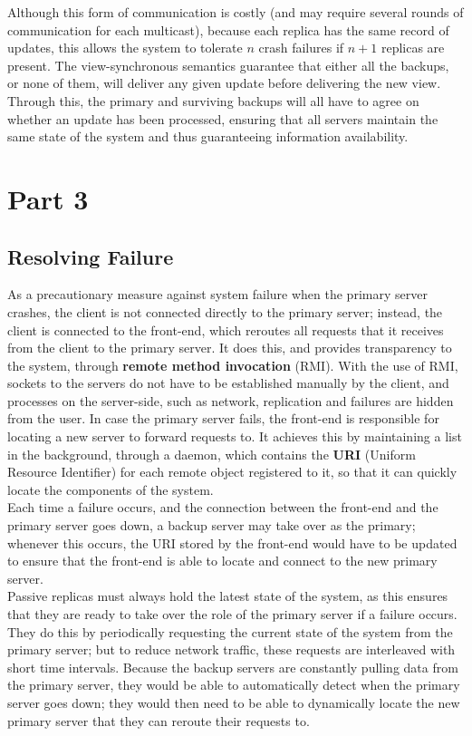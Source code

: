 \documentclass[11pt]{article}
\begin{document}
Although this form of communication is costly (and may require several rounds 
of communication for each multicast), because each replica has the same record 
of updates, this allows the system to tolerate $n$ crash failures if $n+1$ 
replicas are present. The view-synchronous semantics guarantee that either all 
the backups, or none of them, will deliver any given update before delivering 
the new view. Through this, the primary and surviving backups will all 
have to agree on whether an update has been processed, ensuring that all 
servers maintain the same state of the system and thus guaranteeing information 
availability.

\section*{Part 3}
\subsection*{Resolving Failure}
As a precautionary measure against system failure when the primary server 
crashes, the client is not connected directly to the primary server; instead, 
the client is connected to the front-end, which reroutes all requests that it 
receives from the client to the primary server. It does this, and provides 
transparency to the system, through \textbf{remote method invocation} (RMI). 
With the use of RMI, sockets to the servers do not have to be established 
manually by the client, and processes on the server-side, such as network, 
replication and failures are hidden from the user. In case the primary server 
fails, the front-end is responsible for locating a new server to forward 
requests to. It achieves this by maintaining a list in the background, through 
a daemon, which 
contains the \textbf{URI} (Uniform Resource Identifier) for each remote object 
registered to it, so that it can quickly locate the components of the system.\\

Each time a failure occurs, and the connection between the front-end and 
the primary server goes down, a backup server may take over as the primary; 
whenever this occurs, the URI stored by the front-end would have to be 
updated to ensure that the front-end is able to locate and connect to the new 
primary server.\\

Passive replicas must always hold the latest state of the 
system, as this ensures that they are ready to take over the role of the 
primary server if a failure occurs. They do this by periodically requesting the 
current state of the system from the primary server; but to reduce network 
traffic, these requests are interleaved with short time intervals. 
Because the backup servers are constantly pulling data from the primary 
server, they would be able to automatically detect when the primary server goes 
down; they would then need to be able to dynamically locate the new 
primary server that they can reroute their requests to.\\
\end{document}
